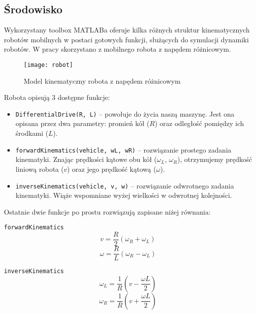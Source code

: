 \documentclass[11pt]{article}
\begin{document}
\newpage

\subsection{Środowisko}

Wykorzystany toolbox MATLABa oferuje kilka różnych struktur kinematycznych robotów mobilnych w postaci gotowych funkcji, służących do symulacji dynamiki robotów. W pracy skorzystano z mobilnego robota z napędem różnicowym.
\begin{figure}[h!]
	\centering
	\texttt{[image: robot]}
	\caption{Model kinematyczny robota z napędem różnicowym}
\end{figure}

Robota opisują 3 dostępne funkcje:
\begin{itemize}[--]
\item \texttt{DifferentialDrive(R, L)} -- powołuje do życia naszą maszynę. Jest ona opisana przez dwa parametry: promień kół ($R$) oraz odległość pomiędzy ich środkami ($L$).
\item \texttt{forwardKinematics(vehicle, wL, wR)} -- rozwiązanie prostego zadania kinematyki. Znając prędkości kątowe obu kół ($\omega_L$, $\omega_R$), otrzymujemy prędkość liniową robota ($v$) oraz jego prędkość kątową ($\omega$).
\item \texttt{inverseKinematics(vehicle, v, w)} -- rozwiązanie odwrotnego zadania kinematyki. Wiąże wspomniane wyżej wielkości w odwrotnej kolejności.
\end{itemize}

Ostatnie dwie funkcje po prostu rozwiązują zapisane niżej równania:

\begin{minipage}{0.5\textwidth}
	\vspace{0.5cm}
	\texttt{forwardKinematics}
	\begin{equation*}
	v = \frac{R}{2} \left( \omega_R + \omega_L \right)
	\end{equation*}
	\begin{equation*}
	\omega = \frac{R}{L} \left( \omega_R - \omega_L \right)
	\end{equation*}
\end{minipage}
\begin{minipage}{0.5\textwidth}
	\vspace{0.5cm}
	\texttt{inverseKinematics}
	\begin{equation*}
	\omega_L = \frac{1}{R} \left( v - \frac{\omega L}{2} \right)
	\end{equation*}
	\begin{equation*}
	\omega_R = \frac{1}{R} \left( v + \frac{\omega L}{2} \right)
	\end{equation*}
\end{minipage}
\end{document}

